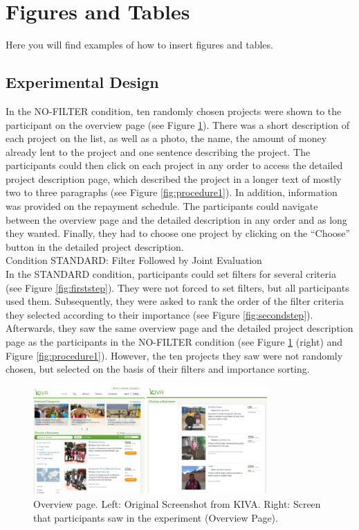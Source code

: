 
\section{Figures and Tables}
Here you will find examples of how to insert figures and tables.


\subsection{Experimental Design}

In the NO-FILTER condition, ten randomly chosen projects were shown to the participant on the overview page
(see Figure \ref{fig:overview}). There was a short description of each project on the list,
as well as a photo, the name, the amount of money already lent to the project
and one sentence describing the project. The participants could then click on
each project in any order to access the detailed project description page,
which described the project in a longer text of mostly two to three paragraphs (see Figure \ref{fig:procedure1}).
In addition, information was provided on the repayment schedule. The participants could navigate
between the overview page and the detailed description in any order and as long they wanted.
Finally, they had to choose one project by clicking on the “Choose” button in the detailed project description.\\
Condition STANDARD: Filter Followed by Joint Evaluation\\
In the STANDARD condition, participants could set filters for several criteria (see Figure \ref{fig:firststep}).
They were not forced to set filters, but all participants used them.
Subsequently, they were asked to rank the order of the filter criteria they selected according to their importance (see Figure \ref{fig:secondstep}).
Afterwards, they saw the same overview page and the detailed project description page as the participants in the NO-FILTER condition (see Figure \ref{fig:overview} (right) and Figure \ref{fig:procedure1}).
However, the ten projects they saw were not randomly chosen, but selected on the basis of their filters and importance sorting.\\
\begin{figure}[h]
    \centering
    \includegraphics[width=0.8\textwidth]{graphics/Bild1}
    \caption{Overview page. Left: Original Screenshot from KIVA. Right: Screen that participants saw in the experiment (Overview Page).}
    \label{fig:overview}
\end{figure}

